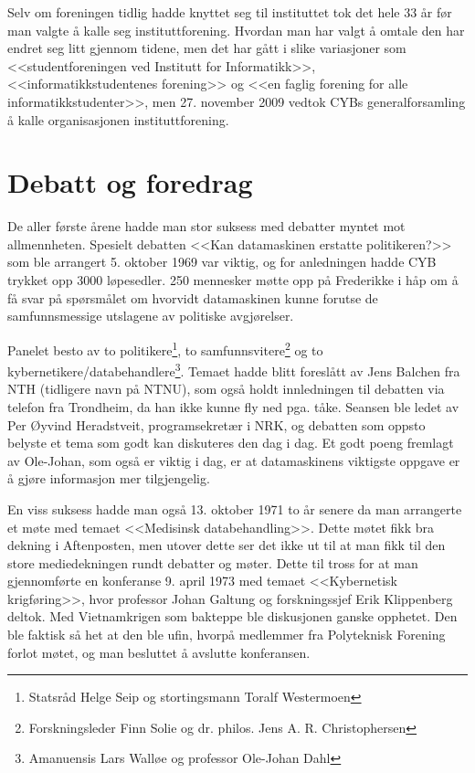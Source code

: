 Selv om foreningen tidlig hadde knyttet seg til instituttet tok det hele 33 år før man valgte å kalle seg instituttforening. Hvordan man har valgt å omtale den har endret seg litt gjennom tidene, men det har gått i slike variasjoner som <<studentforeningen ved Institutt for Informatikk>>, <<informatikkstudentenes forening>> og <<en faglig forening for alle informatikkstudenter>>, men 27. november 2009 vedtok CYBs generalforsamling å kalle organisasjonen instituttforening.

\section{Debatt og foredrag}

De aller første årene hadde man stor suksess med debatter myntet mot allmennheten. Spesielt debatten <<Kan datamaskinen erstatte politikeren?>> som ble arrangert 5. oktober 1969 var viktig, og for anledningen hadde CYB trykket opp 3000 løpesedler. 250 mennesker møtte opp på Frederikke i håp om å få svar på spørsmålet om hvorvidt datamaskinen kunne forutse de samfunnsmessige utslagene av politiske avgjørelser.

Panelet besto av to politikere\footnote{Statsråd Helge Seip og stortingsmann Toralf Westermoen}, to samfunnsvitere\footnote{Forskningsleder Finn Solie og dr. philos. Jens A. R. Christophersen} og to kybernetikere\slash databehandlere\footnote{Amanuensis Lars Walløe og professor Ole-Johan Dahl}. Temaet hadde blitt foreslått av Jens Balchen fra NTH (tidligere navn på NTNU), som også holdt innledningen til debatten via telefon fra Trondheim, da han ikke kunne fly ned pga. tåke. Seansen ble ledet av Per Øyvind Heradstveit, programsekretær i NRK, og debatten som oppsto belyste et tema som godt kan diskuteres den dag i dag. Et godt poeng fremlagt av Ole-Johan, som også er viktig i dag, er at datamaskinens viktigste oppgave er å gjøre informasjon mer tilgjengelig.

En viss suksess hadde man også 13. oktober 1971 to år senere da man arrangerte et møte med temaet <<Medisinsk databehandling>>. Dette møtet fikk bra dekning i Aftenposten, men utover dette ser det ikke ut til at man fikk til den store mediedekningen rundt debatter og møter. Dette til tross for at man gjennomførte en konferanse 9. april 1973 med temaet <<Kybernetisk krigføring>>, hvor professor Johan Galtung og forskningssjef Erik Klippenberg deltok. Med Vietnamkrigen som bakteppe ble diskusjonen ganske opphetet. Den ble faktisk så het at den ble ufin, hvorpå medlemmer fra Polyteknisk Forening forlot møtet, og man besluttet å avslutte konferansen.


